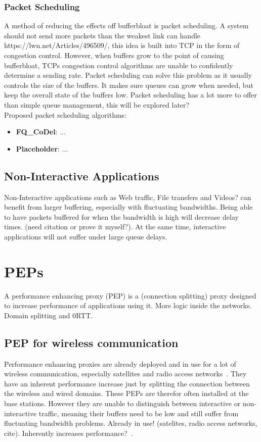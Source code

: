 \documentclass[a4paper,english, 11pt]{report}
\begin{document}
\subsubsection{Packet Scheduling}
A method of reducing the effects off bufferbloat is packet scheduling. A system should not send more packets than the weakest link can handle {https://lwn.net/Articles/496509/}, this idea is built into TCP in the form of congestion control. However, when buffers grow to the point of causing bufferbloat, TCPs congestion control algorithms are unable to confidently determine a sending rate. Packet scheduling can solve this problem as it usually controls the size of the buffers. It makes sure queues can grow when needed, but keep the overall state of the buffers low. Packet scheduling has a lot more to offer than simple queue management, this will be explored later?\\

Proposed packet scheduling algorithms:
\begin{itemize}
  \item \textbf{FQ\_CoDel}: ...
  \item \textbf{Placeholder}: ...
\end{itemize}

\subsection{Non-Interactive Applications}
Non-Interactive applications such as Web traffic, File transfers and Videos? can benefit from larger buffering, especially with fluctuating bandwidths. Being able to have packets buffered for when the bandwidth is high will decrease delay times. (need citation or prove it myself?). At the same time, interactive applications will not suffer under large queue delays.

\section{PEPs}
A performance enhancing proxy (PEP) is a (connection splitting) proxy designed to increase performance of applications using it.
More logic inside the networks. Domain splitting and 0RTT.

\subsection{PEP for wireless communication}
Performance enhancing proxies are already deployed and in use for a lot of wireless communication, especially satellites and radio access networks~\cite{tcp_mmwave_proxy}. They have an inherent performance increase just by splitting the connection between the wireless and wired domains. These PEPs are therefor often installed at the base stations. However they are unable to distinguish between interactive or non-interactive traffic, meaning their buffers need to be low and still suffer from fluctuating bandwidth problems.
 Already in use! (satelites, radio access networks, cite). Inherently increases performance?~\cite{tcp_mmwave_proxy}.
\end{document}
